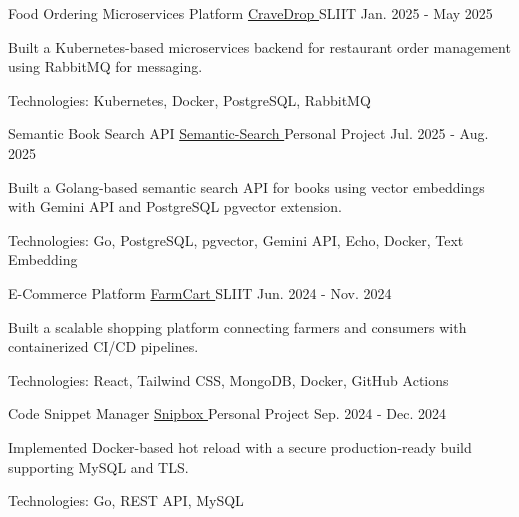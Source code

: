 
\begin{cventries}

  \cventry
    {Food Ordering Microservices Platform}
    {\href{https://github.com/nmdra/CraveDrop}{CraveDrop \faGithub}}
    {SLIIT}
    {Jan. 2025 - May 2025}
    {
      \begin{cvitems}
        \item {Built a Kubernetes-based microservices backend for restaurant order management using RabbitMQ for messaging.}
        \item {Technologies: Kubernetes, Docker, PostgreSQL, RabbitMQ}
      \end{cvitems}
    }

  \cventry
   {Semantic Book Search API}
   {\href{https://github.com/nmdra/Semantic-Search}{Semantic-Search \faGithub}}
   {Personal Project}
   {Jul. 2025 - Aug. 2025}
   {
      \begin{cvitems}
        \item {Built a Golang-based semantic search API for books using vector embeddings with Gemini API and PostgreSQL pgvector extension.}
        \item {Technologies: Go, PostgreSQL, pgvector, Gemini API, Echo, Docker, Text Embedding}
      \end{cvitems}
   }

  \cventry
    {E-Commerce Platform}
    {\href{https://github.com/nmdra/FarmCart}{FarmCart \faGithub}}
    {SLIIT}
    {Jun. 2024 - Nov. 2024}
    {
      \begin{cvitems}
        \item {Built a scalable shopping platform connecting farmers and consumers with containerized CI/CD pipelines.}
        \item {Technologies: React, Tailwind CSS, MongoDB, Docker, GitHub Actions}
      \end{cvitems}
    }

  \cventry
    {Code Snippet Manager}
    {\href{https://github.com/nmdra/snipbox}{Snipbox \faGithub}}
    {Personal Project}
    {Sep. 2024 - Dec. 2024}
    {
      \begin{cvitems}
        \item {Implemented Docker-based hot reload with a secure production-ready build supporting MySQL and TLS.}
        \item {Technologies: Go, REST API, MySQL}
      \end{cvitems}
    }


\end{cventries}
